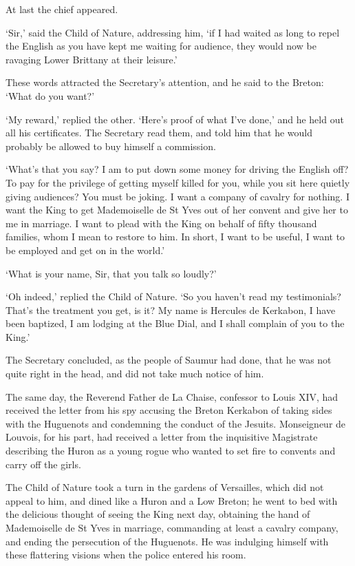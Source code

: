 \documentclass{article}
\begin{document}
\begin{center}
At last the chief appeared. 

`Sir,' said the Child of Nature, addressing him, `if I had waited as long to repel 
the English as you have kept me waiting for audience, they would now be ravaging 
Lower Brittany at their leisure.' 

These words attracted the Secretary's attention, and he said to the Breton: `What 
do you want?' 

`My reward,' replied the other. `Here's proof of what I've done,' and he held out 
all his certificates. The Secretary read them, and told him that he would probably 
be allowed to buy himself a commission. 

`What's that you say? I am to put down some money for driving the English off? 
To pay for the privilege of getting myself killed for you, while you sit here quietly 
giving audiences? You must be joking. I want a company of cavalry for nothing. 
I want the King to get Mademoiselle de St Yves out of her convent and give her 
to me in marriage. I want to plead with the King on behalf of fifty thousand families, 
whom I mean to restore to him. In short, I want to be useful, I want to be employed 
and get on in the world.' 

`What is your name, Sir, that you talk so loudly?' 

`Oh indeed,' replied the Child of Nature. `So you haven't read my testimonials? 
That's the treatment you get, is it? My name is Hercules de Kerkabon, I have been 
baptized, I am lodging at the Blue Dial, and I shall complain of you to the King.' 

The Secretary concluded, as the people of Saumur had done, that he was not quite 
right in the head, and did not take much notice of him. 

The same day, the Reverend Father de La Chaise, confessor to Louis XIV, had received 
the letter from his spy accusing the Breton Kerkabon of taking sides with the Huguenots 
and condemning the conduct of the Jesuits. Monseigneur de Louvois, for his part, 
had received a letter from the inquisitive Magistrate describing the Huron as a 
young rogue who wanted to set fire to convents and carry off the girls. 

The Child of Nature took a turn in the gardens of Versailles, which did not appeal 
to him, and dined like a Huron and a Low Breton; he went to bed with the delicious 
thought of seeing the King next day, obtaining the hand of Mademoiselle de St Yves 
in marriage, commanding at least a cavalry company, and ending the persecution 
of the Huguenots. He was indulging himself with these flattering visions when the 
police entered his room. 


\end{center}
\end{document}
